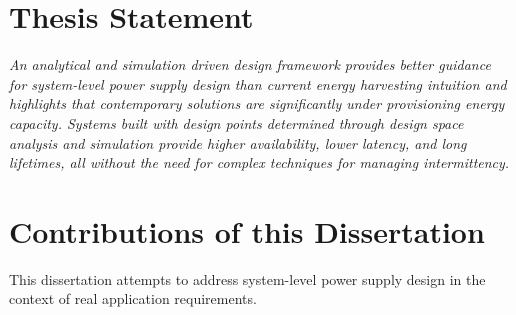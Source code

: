 %
%


\section{Thesis Statement}

\textit{
An analytical and simulation driven design framework provides better guidance for system-level power supply design than current energy harvesting intuition and highlights that contemporary solutions are significantly under provisioning energy capacity. Systems built with design points determined through design space analysis and simulation provide higher availability, lower latency, and long lifetimes, all without the need for complex techniques for managing intermittency.
}

\section{Contributions of this Dissertation}
This dissertation attempts to address system-level power supply design in the context of real application requirements.

